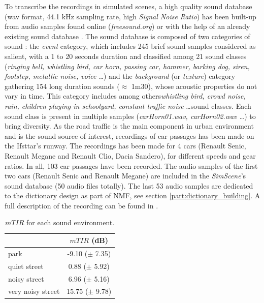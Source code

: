 \documentclass[review,5p,twocolumn,sort&compress,times]{elsarticle}
\begin{document}
To transcribe the recordings in simulated scenes, a high quality sound database (wav format, 44.1 kHz sampling rate, high \textit{Signal Noise Ratio}) has been built-up from audio samples found online (\textit{freesound.org}) or with the help of an already existing sound database \cite{salamon2014dataset}. The sound database is composed of two categories of sound : the \textit{event} category, which includes 245 brief sound samples considered as salient, with a 1 to 20 seconds duration and classified among 21 sound classes (\textit{ringing bell, whistling bird, car horn, passing car, hammer, barking dog, siren, footstep, metallic noise, voice \dots}) and the \textit{background} (or \textit{texture}) category gathering 154 long duration sounds ($\approx$ 1m30), whose acoustic properties do not vary in time. This category includes among others\textit{whistling bird, crowd noise, rain, children playing in schoolyard, constant traffic noise} \dots sound classes. Each sound class is present in multiple samples (\textit{carHorn01.wav, carHorn02.wav \dots}) to bring diversity.
As the road traffic is the main component in urban environment and is the sound source of interest, recordings of car passages has been made on the Ifsttar's runway. The recordings has been made for 4 cars (Renault Senic, Renault Megane and Renault Clio, Dacia Sandero),  for different speeds and gear ratios. In all, 103 car passages have been recorded. The audio samples of the first two cars (Renault Senic and Renault Megane) are included in the \textit{SimScene}'s sound database (50 audio files totally). The last 53 audio samples are dedicated to the dictionary design as part of NMF, see section \ref{part:dictionary_building}. A full description of the recording can be found in \cite{gloaguen_creation_2017}.

\begin{table}[t]
\centering
\caption{$mTIR$ for each sound environment.}
\begin{tabular}{lc}
 & $mTIR$ (dB)\\ \hline
 park & -9.10 ($\pm$ 7.35) \\
 quiet street & 0.88 ($\pm$ 5.92) \\
 noisy street & 6.96 ($\pm$ 5.16) \\
 very noisy street & 15.75 ($\pm$ 9.78) \\ \hline
\end{tabular}
\label{tab:mTIR}
\end{table}
\end{document}
